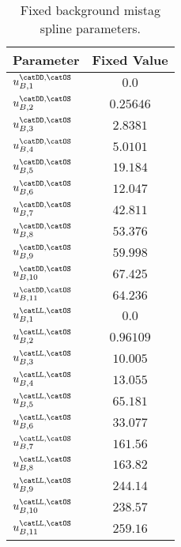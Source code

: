 \begin{table}[htb]
\caption{Fixed background \OS mistag spline parameters.}
\label{tab:app:measurement_of_sin2beta:cpv_measurement:fixed_parameters:eta:bkg:os}
\centering
\begin{tabular}{lr@{$\,\pm\,$}l}
  \toprule
  Parameter                           & \multicolumn{2}{c}{Fixed Value} \\
  \midrule
    $u_{B,1}^\text{\catDD,\catOS}$    & \multicolumn{2}{c}{$0.0$}\\
    $u_{B,2}^\text{\catDD,\catOS}$    & \multicolumn{2}{c}{$0.25646$}\\
    $u_{B,3}^\text{\catDD,\catOS}$    & \multicolumn{2}{c}{$2.8381$}\\
    $u_{B,4}^\text{\catDD,\catOS}$    & \multicolumn{2}{c}{$5.0101$}\\
    $u_{B,5}^\text{\catDD,\catOS}$    & \multicolumn{2}{c}{$19.184$}\\
    $u_{B,6}^\text{\catDD,\catOS}$    & \multicolumn{2}{c}{$12.047$}\\
    $u_{B,7}^\text{\catDD,\catOS}$    & \multicolumn{2}{c}{$42.811$}\\
    $u_{B,8}^\text{\catDD,\catOS}$    & \multicolumn{2}{c}{$53.376$}\\
    $u_{B,9}^\text{\catDD,\catOS}$    & \multicolumn{2}{c}{$59.998$}\\
    $u_{B,10}^\text{\catDD,\catOS}$   & \multicolumn{2}{c}{$67.425$}\\
    $u_{B,11}^\text{\catDD,\catOS}$   & \multicolumn{2}{c}{$64.236$}\\
    $u_{B,1}^\text{\catLL,\catOS}$    & \multicolumn{2}{c}{$0.0$}\\    
    $u_{B,2}^\text{\catLL,\catOS}$    & \multicolumn{2}{c}{$0.96109$}\\    
    $u_{B,3}^\text{\catLL,\catOS}$    & \multicolumn{2}{c}{$10.005$}\\    
    $u_{B,4}^\text{\catLL,\catOS}$    & \multicolumn{2}{c}{$13.055$}\\    
    $u_{B,5}^\text{\catLL,\catOS}$    & \multicolumn{2}{c}{$65.181$}\\    
    $u_{B,6}^\text{\catLL,\catOS}$    & \multicolumn{2}{c}{$33.077$}\\    
    $u_{B,7}^\text{\catLL,\catOS}$    & \multicolumn{2}{c}{$161.56$}\\    
    $u_{B,8}^\text{\catLL,\catOS}$    & \multicolumn{2}{c}{$163.82$}\\    
    $u_{B,9}^\text{\catLL,\catOS}$    & \multicolumn{2}{c}{$244.14$}\\    
    $u_{B,10}^\text{\catLL,\catOS}$   & \multicolumn{2}{c}{$238.57$}\\    
    $u_{B,11}^\text{\catLL,\catOS}$   & \multicolumn{2}{c}{$259.16$}\\    
  \bottomrule
\end{tabular}
\end{table}
